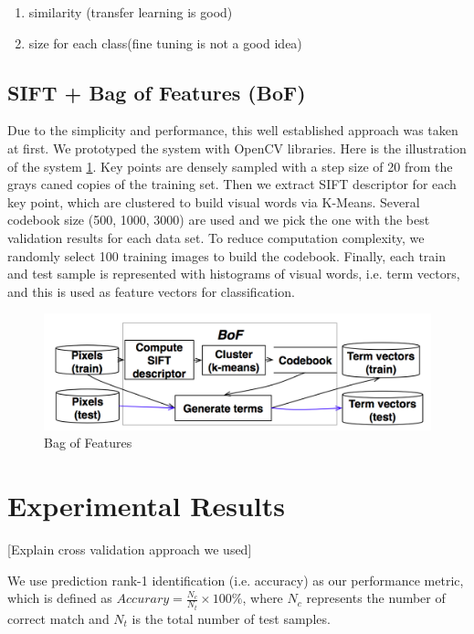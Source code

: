 \documentclass[journal, 10pt]{IEEEtran}
\begin{document}
    \begin{enumerate}
      \item similarity (transfer learning is good)
      \item size for each class(fine tuning is not a good idea)
    \end{enumerate}

    \subsection{SIFT + Bag of Features (BoF) }
   Due to the simplicity and performance, this well established approach was taken at first.  We prototyped the system with OpenCV libraries.  Here is the illustration of the system \ref{fig:bofsystemdesign}.
 Key points are densely sampled with a step size of 20 from the grays caned copies of the training set. Then we extract SIFT descriptor for each key point, which are clustered to build visual words via K-Means. Several codebook size (500, 1000, 3000) are used and we pick the one with the best validation results for each data set. To reduce computation complexity, we randomly select 100 training images to build the codebook.  Finally, each train and test sample is represented with histograms of visual words, i.e. term vectors, and this is used as feature vectors for classification.
\begin{figure}[H]
  \centering
  \includegraphics[width=1.00\linewidth]{bof}
  \caption{ Bag of Features }
  \label{fig:bofsystemdesign}
\end{figure}

\section{Experimental Results}
[Explain cross validation approach we used]

We use prediction rank-1 identification (i.e. accuracy) as our performance metric, which is defined as $Accurary = \frac{N_c}{N_t} \times 100 \%$, where $N_c$ represents the number of correct match and $N_t$ is the total number of test samples.
\end{document}
